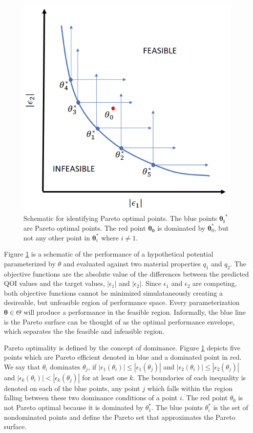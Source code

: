 \begin{figure}[ht]
	\centering
  \includegraphics[width=5in]{chapter3/img/fig_pareto_schematic}
  \caption{Schematic for identifying Pareto optimal points.  The blue points $\bm{\theta_i}^*$ are Pareto optimal points.  The red point $\bm{\theta_0}$ is dominated by $\bm{\theta}_0^*$, but not any other point in $\bm{\theta}_i^*$ where $i \neq 1$.}
  \label{fig:pareto_dominance}
\end{figure}

Figure \ref{fig:pareto_dominance} is a schematic of the performance of a hypothetical potential parameterized by $\theta$ and evaluated against two material properties $q_1$ and $q_2$.  The objective functions are the absolute value of the differences between the predicted QOI values and the target values, $|\epsilon_1|$ and $|\epsilon_2|$.  Since $\epsilon_1$ and $\epsilon_2$ are competing, both objective functions cannot be minimized simulataneously creating a desireable, but unfeasible region of performance space. Every parameterization $\bm{\theta} \in \Theta$ will produce a performance in the feasible region.  Informally, the blue line is the Pareto surface can be thought of as the optimal performance envelope, which separates the the feasible and infeasible region.

Pareto optimality is defined by the concept of dominance.  Figure \ref{fig:pareto_dominance} depicts five points which are Pareto efficient denoted in blue and a dominated point in red.  We say that $\theta_i$ dominates $\theta_j$, if
 $|\epsilon_1(\theta_i)| \leq |\epsilon_1(\theta_j)|$ and
 $|\epsilon_2(\theta_i)| \leq |\epsilon_2(\theta_j)|$ and
 $|\epsilon_k(\theta_i)| < |\epsilon_k(\theta_j)|$ for at least one $k$.
 The boundaries of each inequality is denoted on each of the blue points, any point $j$ which falls within the region falling between these two dominance conditions of a point $i$.  The red point $\theta_0$ is not Pareto optimal because it is dominated by $\theta_1^*$.  The blue points $\theta_i^*$ is the set of nondominated points and define the Pareto set that approximates the Pareto surface.

